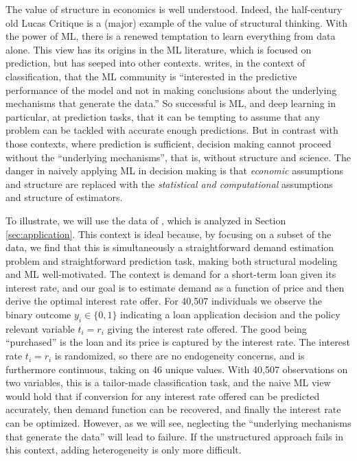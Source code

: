 \documentclass[12pt]{article}
\numberwithin{equation}{section}
\theoremstyle{definition}
\begin{document}
The value of structure in economics is well understood. Indeed, the half-century old Lucas Critique is a (major) example of the value of structural thinking. With the power of ML, there is a renewed temptation to learn everything from data alone. This view has its origins in the ML literature, which is focused on prediction, but has seeped into other contexts. \cite{Zadrozny2004_ICML} writes, in the context of classification, that the ML community is ``interested in the predictive performance of the model and not in making conclusions about the underlying mechanisms that generate the data.'' So successful is ML, and deep learning in particular, at prediction tasks, that it can be tempting to assume that any problem can be tackled with accurate enough predictions. But in contrast with those contexts, where prediction is sufficient, decision making cannot proceed without the ``underlying mechanisms'', that is, without structure and science. The danger in naively applying ML in decision making is that \emph{economic} assumptions and structure are replaced with the \emph{statistical and computational} assumptions and structure of estimators. 

To illustrate, we will use the data of \cite{Bertrand-etal2010_QJE}, which is analyzed in Section \ref{sec:application}. This context is ideal because, by focusing on a subset of the data, we find that this is simultaneously a straightforward demand estimation problem and straightforward prediction task, making both structural modeling and ML well-motivated. The context is demand for a short-term loan given its interest rate, and our goal is to estimate demand as a function of price and then derive the optimal interest rate offer. For 40,507 individuals we observe the binary outcome $y_i \in \{0,1\}$ indicating a loan application decision and the policy relevant variable $t_i = r_i$ giving the interest rate offered. The good being ``purchased'' is the loan and its price is captured by the interest rate. The interest rate $t_i = r_i$ is randomized, so there are no endogeneity concerns, and is furthermore continuous, taking on 46 unique values. With 40,507 observations on two variables, this is a tailor-made classification task, and the naive ML view would hold that if conversion for any interest rate offered can be predicted accurately, then demand function can be recovered, and finally the interest rate can be optimized. However, as we will see, neglecting the ``underlying mechanisms that generate the data'' will lead to failure. If the unstructured approach fails in this context, adding heterogeneity is only more difficult. 
\end{document}
